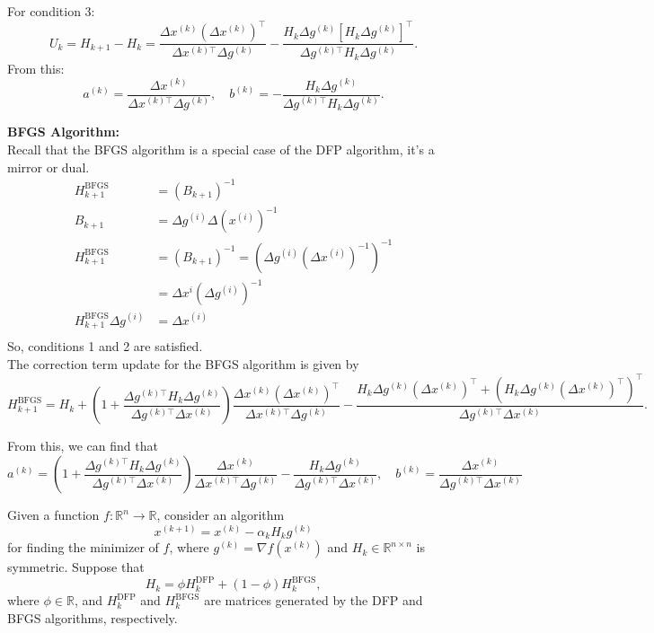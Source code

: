 \documentclass{article}
\begin{document}
\begin{enumerate}
\begin{enumerate}
For condition 3:
\[
U_k = H_{k+1} - H_k = 
\frac{\Delta x^{(k)} (\Delta x^{(k)})^\top}{\Delta x^{(k)\top} \Delta g^{(k)}} - 
\frac{H_k \Delta g^{(k)} [H_k \Delta g^{(k)}]^\top}{\Delta g^{(k)\top} H_k \Delta g^{(k)}}.
\]
From this:
\[
a^{(k)} = \frac{\Delta x^{(k)}}{\Delta x^{(k)\top} \Delta g^{(k)}}, \quad 
b^{(k)} = -\frac{H_k \Delta g^{(k)}}{\Delta g^{(k)\top} H_k \Delta g^{(k)}}.
\]

\textbf{BFGS Algorithm:} \\
Recall that the BFGS algorithm is a special case of the DFP algorithm, it's a mirror or dual.\\
\begin{align*}
  H_{k+1}^{\text{BFGS}} &= (B_{k+1})^{-1} \\
  B_{k+1} &= \Delta g^{(i)} \Delta (x^{(i)})^{-1} \\
  H_{k+1}^{\text{BFGS}} &= (B_{k+1})^{-1} = (\Delta g^{(i)} (\Delta x^{(i)})^{-1} )^{-1}\\
  &= \Delta x^{i}(\Delta g^{(i)})^{-1}\\
  H_{k+1}^{\text{BFGS}} \Delta g^{(i)} &= \Delta x^{(i)}\\
\end{align*}
So, conditions 1 and 2 are satisfied.\\
The correction term update for the BFGS algorithm is given by
\[
H_{k+1}^{\text{BFGS}} = H_k + 
\left( 1 + \frac{\Delta g^{(k)\top} H_k \Delta g^{(k)}}{\Delta g^{(k)\top} \Delta x^{(k)}} \right)
\frac{\Delta x^{(k)} (\Delta x^{(k)})^\top}{\Delta x^{(k)\top} \Delta g^{(k)}} -
\frac{H_k \Delta g^{(k)} (\Delta x^{(k)})^\top + (H_k \Delta g^{(k)} (\Delta x^{(k)})^\top)^\top}{\Delta g^{(k)\top} \Delta x^{(k)}}.
\]

From this, we can find that 
\[
a^{(k)} = \left( 
  1 + \frac{\Delta g^{(k)\top} H_k \Delta g^{(k)}}{\Delta g^{(k)\top} \Delta x^{(k)}} 
  \right)
  \frac{\Delta x^{(k)}}{\Delta x^{(k)\top} \Delta g^{(k)}} 
  - \frac{H_k \Delta g^{(k)}}{\Delta g^{(k)\top} \Delta x^{(k)}}
, \quad 
b^{(k)} = \frac{\Delta x^{(k)}}{\Delta g^{(k)\top} \Delta x^{(k)}}
\]
\end{enumerate}
\begin{bb}
\item 
Given a function $f : \mathbb{R}^n \to \mathbb{R}$, consider an algorithm 
\[
x^{(k+1)} = x^{(k)} - \alpha_k H_k g^{(k)}
\]
for finding the minimizer of $f$, where $g^{(k)} = \nabla f(x^{(k)})$ and $H_k \in \mathbb{R}^{n \times n}$ is symmetric. Suppose that 
\[
H_k = \phi H_k^{\text{DFP}} + (1 - \phi) H_k^{\text{BFGS}},
\]
where $\phi \in \mathbb{R}$, and $H_k^{\text{DFP}}$ and $H_k^{\text{BFGS}}$ are matrices generated by the DFP and BFGS algorithms, respectively.


\end{bb}
\end{enumerate}
\end{document}
